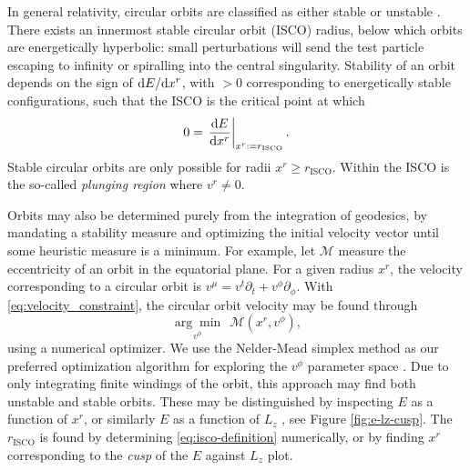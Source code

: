 In general relativity, circular orbits are classified as either stable or unstable \citep{wilkins_bound_1972,bardeen_rotating_1972}. There exists an innermost stable circular orbit (ISCO) radius, below which orbits are energetically hyperbolic: small perturbations will send the test particle escaping to infinity or spiralling into the central singularity.  Stability of an orbit depends on the sign of $\text{d} E / \text{d} x^r$, with $>0$ corresponding to energetically stable configurations, such that the ISCO is the critical point at which 
\begin{equation}
    \label{eq:isco-definition}
    0 = \left. \frac{\text{d} E}{\text{d} x^r} \right\rvert_{x^r := r_\text{ISCO}}.
\end{equation}
Stable circular orbits are only possible for radii $x^r \geq r_\text{ISCO}$. Within the ISCO is the so-called \textit{plunging region} where $v^r \neq 0$. 


Orbits may also be determined purely from the integration of geodesics, by mandating a stability measure and optimizing the initial velocity vector until some heuristic measure is a minimum. For example, let $\mathscr{M}$ measure the eccentricity of an orbit in the equatorial plane. For a given radius $x^r$, the velocity corresponding to a circular orbit is $v^\mu = v^t \partial_t + v^\phi \partial_\phi $. With \eqref{eq:velocity_constraint}, the circular orbit velocity may be found through
\begin{equation}
    \underset{v^\phi}{\arg \min}\ \ \mathscr{M}(x^r, v^\phi),
\end{equation}
using a numerical optimizer. We use the Nelder-Mead simplex method as our preferred optimization algorithm for exploring the $v^\phi$ parameter space \citep{nelder_simplex_1965}. Due to only integrating finite windings of the orbit, this approach may find both unstable and stable orbits. These may be distinguished by inspecting $E$ as a function of $x^r$, or similarly $E$ as a function of $L_z$ \citep{hackmann_charged_2013}, see Figure \ref{fig:e-lz-cusp}. The $r_\text{ISCO}$ is found by determining \eqref{eq:isco-definition} numerically, or by finding $x^r$ corresponding to the \textit{cusp} of the $E$ against $L_z$ plot.


